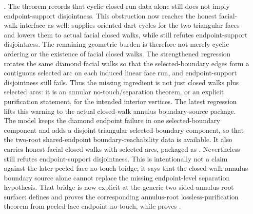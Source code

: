 \documentclass[11pt]{article}
\begin{document}
.  The theorem
 records
that cyclic closed-run data alone still does not imply endpoint-support
disjointness.
This obstruction now reaches the honest facial-walk interface as well:
 supplies oriented dart cycles
for the two triangular faces and
 lowers them to actual
facial closed walks, while
still refutes endpoint-support disjointness.  The remaining geometric burden
is therefore not merely cyclic ordering or the existence of facial closed
walks.  The strengthened regression
rotates the same diamond facial walks so that the selected-boundary edges form
a contiguous selected arc on each induced linear face run, and endpoint-support
disjointness still fails.  Thus the missing ingredient is not just closed
walks plus selected arcs: it is an annular no-touch/separation theorem, or an
explicit purification statement, for the intended interior vertices.
The latest regression lifts this warning to the actual closed-walk annulus
boundary-source package.  The model
 keeps the diamond endpoint failure in one
selected-boundary component and adds a disjoint triangular selected-boundary
component, so that the two-root shared-endpoint boundary-reachability data
 is available.  It
also carries honest facial closed walks with selected arcs, packaged as
.  Nevertheless
still refutes endpoint-support disjointness.  This is intentionally not a
claim against the later peeled-face no-touch bridge; it says that the
closed-walk annulus boundary source alone cannot replace the missing
endpoint-level separation hypothesis.  That bridge is now explicit at the
generic two-sided annulus-root surface:
 defines
and proves the corresponding annulus-root lossless-purification theorem from
peeled-face endpoint no-touch, while  proves
.
\end{document}

